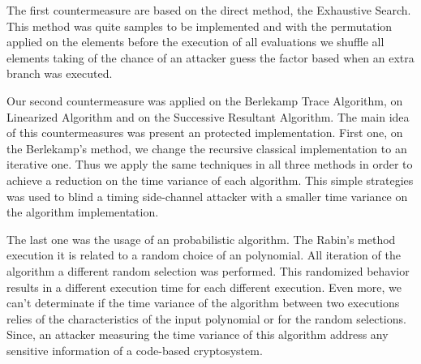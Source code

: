 The first countermeasure are based on the direct method, the Exhaustive Search. This method was quite samples to be implemented and with the permutation applied on the elements before the execution of all evaluations we shuffle all elements taking of the chance of an attacker guess the factor based when an extra branch was executed.

Our second countermeasure was applied on the Berlekamp Trace Algorithm, on Linearized Algorithm and on the Successive Resultant Algorithm. The main idea of this countermeasures was present an protected implementation. First one, on the Berlekamp's method, we change the recursive classical implementation to an iterative one. Thus we apply the same techniques in all three methods in order to achieve a reduction on the time variance of each algorithm. This simple strategies was used to blind a timing side-channel attacker with a smaller time variance on the algorithm implementation.  


The last one was the usage of an probabilistic algorithm. The Rabin's method execution it is related to a random choice of an polynomial. All iteration of the algorithm a different random selection was performed. This randomized behavior results in a different execution time for each different execution. Even more, we can't determinate if the time variance of the algorithm between two executions relies of the characteristics of the input polynomial or for the random selections. Since, an attacker measuring the time variance of this algorithm address any sensitive information of a code-based cryptosystem.




